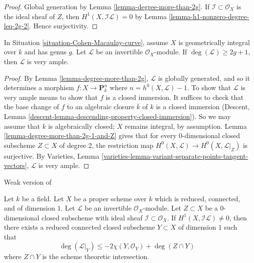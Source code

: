 \begin{proof}
Global generation by Lemma \ref{lemma-degree-more-than-2g}.
If $\mathcal{I} \subset \mathcal{O}_X$ is the ideal sheaf
of $Z$, then $H^1(X, \mathcal{I}\mathcal{L}) = 0$ by
Lemma \ref{lemma-h1-nonzero-degree-leq-2g-2}. Hence surjectivity.
\end{proof}

\begin{lemma}
\label{lemma-degree-at-least-2g+1}
In Situation \ref{situation-Cohen-Macaulay-curve},
assume $X$ is geometrically integral over $k$ and has genus $g$.
Let $\mathcal{L}$ be an invertible $\mathcal{O}_X$-module.
If $\deg(\mathcal{L}) \geq 2g + 1$, then $\mathcal{L}$
is very ample.
\end{lemma}

\begin{proof}
By Lemma \ref{lemma-degree-more-than-2g}, $\mathcal{L}$
is globally generated, and so it determines a morphism
$f : X \to \mathbf{P}^n_k$ where $n = h^0(X,\mathcal{L}) - 1$. To show that
$\mathcal{L}$ is very ample means to show that
$f$ is a closed immersion. It suffices to check that the base change
of $f$ to an algebraic closure $\overline{k}$ of $k$ is a closed immersion
(Descent, Lemma \ref{descent-lemma-descending-property-closed-immersion}).
So we may assume that $k$ is algebraically closed; $X$ remains
integral, by assumption. Lemma \ref{lemma-degree-more-than-2g-1-and-Z}
gives that for every $0$-dimensional closed subscheme
$Z\subset X$ of degree 2,
the restriction map $H^0(X, \mathcal{L}) \to H^0(X, \mathcal{L}|_Z)$
is surjective. By Varieties, Lemma
\ref{varieties-lemma-variant-separate-points-tangent-vectors},
$\mathcal{L}$ is very ample.
\end{proof}


\begin{lemma}
\label{lemma-vanishing-on-gorenstein}
\begin{reference}
Weak version of \cite[Lemma 4]{Jongmin}
\end{reference}
Let $k$ be a field. Let $X$ be a proper scheme over $k$
which is reduced, connected, and of dimension $1$.
Let $\mathcal{L}$ be an invertible $\mathcal{O}_X$-module.
Let $Z \subset X$ be a $0$-dimensional closed subscheme with ideal
sheaf $\mathcal{I} \subset \mathcal{O}_X$.
If $H^1(X, \mathcal{I}\mathcal{L}) \not = 0$, then there exists
a reduced connected closed subscheme $Y \subset X$
of dimension $1$ such that
$$
\deg(\mathcal{L}|_Y) \leq -2\chi(Y, \mathcal{O}_Y) + \deg(Z \cap Y)
$$
where $Z \cap Y$ is the scheme theoretic intersection.
\end{lemma}

